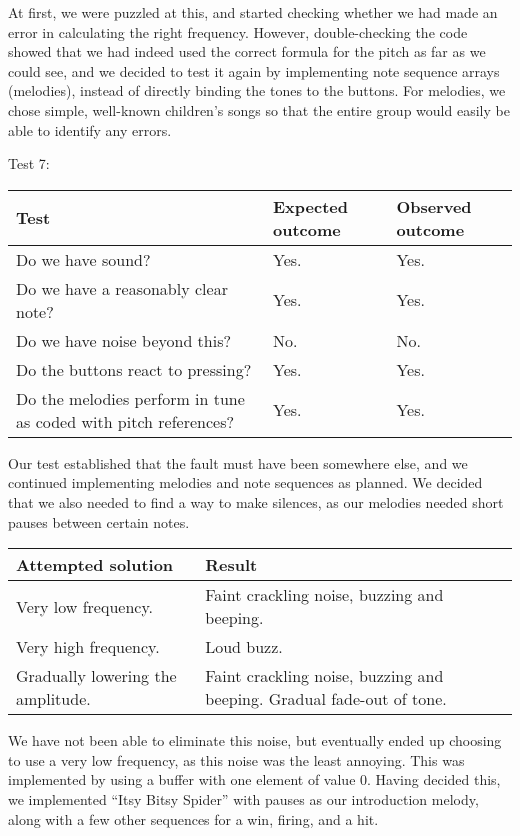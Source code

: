 At first, we were puzzled at this, and started checking whether we had made an error in calculating the right frequency. However, double-checking the code showed that we had indeed used the
correct formula for the pitch as far as we could see, and we
decided to test it again by implementing note sequence arrays
(melodies), instead of directly binding the tones to the buttons. For
melodies, we chose simple, well-known children's songs so that the
entire group would easily be able to identify any errors.

Test 7:
\begin{center}
\begin{tabular}{|p{3.6cm}|p{3.6cm}|p{3.6cm}|}
\hline
{\sc Test} & {\sc Expected outcome} & {\sc Observed outcome}\\ \hline
Do we have sound? & Yes. & Yes.\\ \hline
Do we have a reasonably clear note? & Yes. & Yes. \\ \hline
Do we have noise beyond this? & No. & No. \\ \hline
Do the buttons react to pressing? & Yes. & Yes.\\ \hline
Do the melodies perform in tune as coded with pitch references? & Yes. &
Yes. \\ \hline
\end{tabular}
\end{center}

Our test established that the fault must have been somewhere else, and we
continued implementing melodies and note sequences as planned. We
decided that we also needed to find a way to make silences, as our
melodies needed short pauses between certain notes.

\begin{center}
\begin{tabular}{|p{5cm}|p{5cm}|}
\hline
{\sc Attempted solution} & {\sc Result} \\ \hline
Very low frequency.	& Faint crackling noise, buzzing and beeping.  \\ \hline
Very high frequency. & Loud buzz.  \\ \hline
Gradually lowering the amplitude. & Faint crackling noise, buzzing and beeping. Gradual fade-out of tone. \\ \hline
\end{tabular}
\end{center}

We have not been able to eliminate this noise, but eventually ended up
choosing to use a very low frequency, as this noise was the least
annoying. This was implemented by using a buffer with one element of
value 0. Having decided this, we implemented ``Itsy Bitsy Spider'' with
pauses as our introduction melody, along with a few other sequences for
a win, firing, and a hit.

